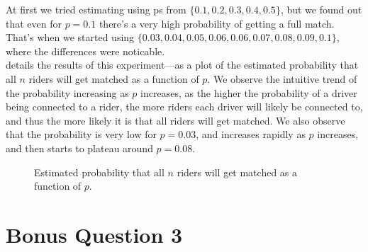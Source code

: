 \documentclass{article}
\begin{document}
\begin{enumerate}[label=(\alph*)]
    At first we tried estimating using ps from $\{0.1, 0.2, 0.3, 0.4, 0.5\}$, but we found out that even for $p=0.1$ there's a very high probability of getting a full match.\\
    That's when we started using $\{0.03, 0.04, 0.05, 0.06, 0.06, 0.07, 0.08, 0.09, 0.1\}$, where the differences were noticable.\\
    
     details the results of this experiment---as a plot of the estimated probability that all $n$ riders will get matched as a function of $p$. We observe the intuitive trend of the probability increasing as $p$ increases, as the higher the probability of a driver being connected to a rider, the more riders each driver will likely be connected to, and thus the more likely it is that all riders will get matched. We also observe that the probability is very low for $p = 0.03$, and increases rapidly as $p$ increases, and then starts to plateau around $p = 0.08$.
    
    \begin{figure*}[h]
        \centering
        \resizebox{0.6\textwidth}{!}{
            
        }
        \caption{Estimated probability that all $n$ riders will get matched as a function of $p$.}
        \label{fig:q10d}
    \end{figure*}

    
\end{enumerate}

\section{Bonus Question 3}
\end{document}
